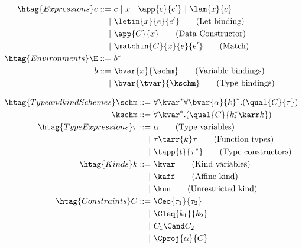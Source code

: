 \begin{subfigure}[t]{0.45\linewidth}
\begin{align*}
  \htag{Expressions}
  e ::=&\ c\ |\ x\ |\ \app{e}{e'}\ |\ \lam{x}{e}\\
  |&\ \letin{x}{e}{e'}\tag{Let binding}\\
  |&\ \app{C}{x}\tag{Data Constructor}\\
  |&\ \matchin{C}{x}{e}{e'}\tag{Match}\\
  \htag{Environments}
  \E ::=&\ b^*\\
  b ::=&\ \bvar{x}{\schm}\tag{Variable bindings}\\
  |&\ \bvar{\tvar}{\kschm}\tag{Type bindings}\\
\end{align*}
\end{subfigure}\hfill
\begin{subfigure}[t]{0.5\linewidth}
\begin{align*}
  \htag{Type and kind Schemes}
  \schm ::=&\ \forall\kvar^*\forall\bvar{\alpha}{k}^*.(\qual{C}{\tau})\\
  \kschm ::=&\ \forall\kvar^*.(\qual{C}{k_i^* \karr k})\\
  \htag{Type Expressions}
  \tau ::=&\ \alpha\tag{Type variables}\\
  |&\ \tau\tarr{k}\tau\tag{Function types}\\
  |&\ \tapp{t}{\tau^*}\tag{Type constructors}\\
  \htag{Kinds}
  k ::=&\ \kvar\tag{Kind variables}\\
  |&\ \kaff\tag{Affine kind}\\
  |&\ \kun\tag{Unrestricted kind}\\
  \htag{Constraints}
  C ::=&\ \Ceq{\tau_1}{\tau_2}\\
  |&\ \Cleq{k_1}{k_2}\\
  |&\ C_1 \Cand C_2\\
  |&\ \Cproj{\alpha}{C}
\end{align*}
\end{subfigure}

